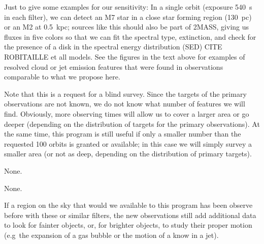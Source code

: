 \documentclass[12pt]{article}
\begin{document}
Just to give some examples for our sensitivity: In a single orbit (exposure 540~s in each filter), we can detect an M7 star in a close star forming region (130~pc) or an M2 at 0.5~kpc; sources like this should also be part of 2MASS, giving us fluxes in five colors so that we can fit the spectral type, extinction, and check for the presence of a disk in the spectral energy distribution (SED) CITE ROBITAILLE et all models.
See the figures in the text above for examples of resolved cloud or jet emission features that were found in observations comparable to what we propose here.

Note that this is a request for a blind survey. Since the targets of the primary observations are not known, we do not know what number of features we will find. Obviously, more observing times will allow us to cover a larger area or go deeper (depending on the distribution of targets for the primary observations). At the same time, this program is still useful if only a smaller number than the requested 100 orbits is granted or available; in this case we will simply survey a smaller area (or not as deep, depending on the distribution of primary targets).




%
%
\specialreq             %
None.


%
%
\coordinatedobs          %
None.


%
%
\duplications           %
If a region on the sky that would we available to this program has been observe before with these or similar filters, the new observations still add additional data to look for fainter objects, or, for brighter objects, to study their proper motion (e.g\ the expansion of a gas bubble or the motion of a know in a jet).

\end{document}
